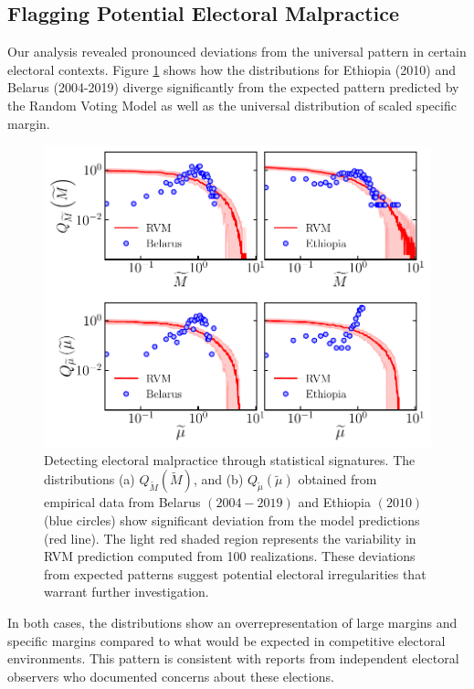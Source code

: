 \subsection{Flagging Potential Electoral Malpractice}
Our analysis revealed pronounced deviations from the universal pattern in certain electoral contexts. Figure \ref{fig:malpractice} shows how the distributions for Ethiopia (2010) and Belarus (2004-2019) diverge significantly from the expected pattern predicted by the Random Voting Model as well as the universal distribution of scaled specific margin.
\begin{figure}[h]
    \centering
    \includegraphics[width=\textwidth]{chapters/chapter7/malpractice_flag.pdf}
    \caption{Detecting electoral malpractice through statistical signatures. The distributions (a) $Q_{\widetilde{M}}(\widetilde{M})$, and (b) $Q_{\widetilde{\mu}}(\widetilde{\mu})$ obtained from empirical data from Belarus $(2004-2019)$ and Ethiopia $(2010)$ (blue circles) show significant deviation from the model predictions (red line). The light red shaded region represents the variability in RVM prediction computed from 100 realizations. These deviations from expected patterns suggest potential electoral irregularities that warrant further investigation.}
    \label{fig:malpractice}
\end{figure}
In both cases, the distributions show an overrepresentation of large margins and specific margins compared to what would be expected in competitive electoral environments. This pattern is consistent with reports from independent electoral observers who documented concerns about these elections.

